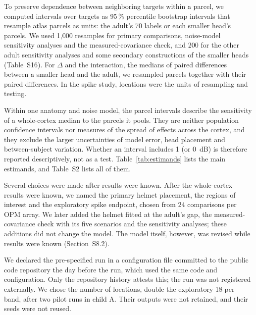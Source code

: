 \documentclass[preprint,12pt,authoryear,a4paper]{elsarticle}
\begin{document}
To preserve dependence between neighboring targets within a parcel, we computed intervals over targets as 95\,\% percentile bootstrap intervals that resample atlas parcels as units: the adult's 70 labels or each smaller head's parcels. We used 1,000 resamples for primary comparisons, noise-model sensitivity analyses and the measured-covariance check, and 200 for the other adult sensitivity analyses and some secondary constructions of the smaller heads (Table~S16). For $\Delta$ and the interaction, the medians of paired differences between a smaller head and the adult, we resampled parcels together with their paired differences. In the spike study, locations were the units of resampling and testing.

Within one anatomy and noise model, the parcel intervals describe the sensitivity of a whole-cortex median to the parcels it pools. They are neither population confidence intervals nor measures of the spread of effects across the cortex, and they exclude the larger uncertainties of model error, head placement and between-subject variation. Whether an interval includes 1 (or 0~dB) is therefore reported descriptively, not as a test. Table~\ref{tab:estimands} lists the main estimands, and Table~S2 lists all of them.

Several choices were made after results were known. After the whole-cortex results were known, we named the primary helmet placement, the regions of interest and the exploratory spike endpoint, chosen from 24 comparisons per OPM array. We later added the helmet fitted at the adult's gap, the measured-covariance check with its five scenarios and the sensitivity analyses; these additions did not change the model. The model itself, however, was revised while results were known (Section~S8.2).

We declared the pre-specified run in a configuration file committed to the public code repository the day before the run, which used the same code and configuration. Only the repository history attests this; the run was not registered externally. We chose the number of locations, double the exploratory 18 per band, after two pilot runs in child A. Their outputs were not retained, and their seeds were not reused.
\end{document}
